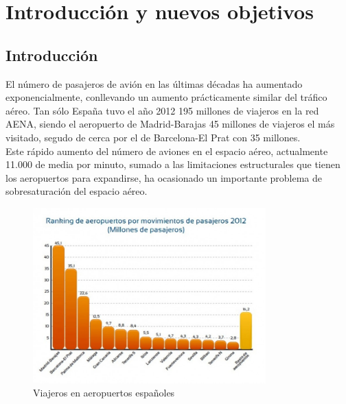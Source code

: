 \chapter{Introducción y nuevos objetivos}

\section{Introducción}
El número de pasajeros de avión en las últimas décadas ha aumentado exponencialmente, conllevando un aumento prácticamente similar del tráfico aéreo. Tan sólo España tuvo el año 2012 195 millones de viajeros en la red AENA, siendo el aeropuerto de Madrid-Barajas 45 millones de viajeros el más visitado, segudo de cerca por el de Barcelona-El Prat con 35 millones. \\
Este rápido aumento del número de aviones en el espacio aéreo, actualmente 11.000 de media por minuto, sumado a las limitaciones estructurales que tienen los aeropuertos para expandirse, ha ocasionado un importante problema de sobresaturación del espacio aéreo.
\begin{figure}[H]
	\begin{center}
		\centering
		\includegraphics[width=0.8\textwidth]{./imagenes/introduccion/Ranking_de_aeropuertos_espayoles_por_pasajeros_horiz.jpg}
		\caption{Viajeros en aeropuertos españoles}
		\label{fig: Viajeros en aeropuertos españoles}
	\end{center}
\end{figure}	

